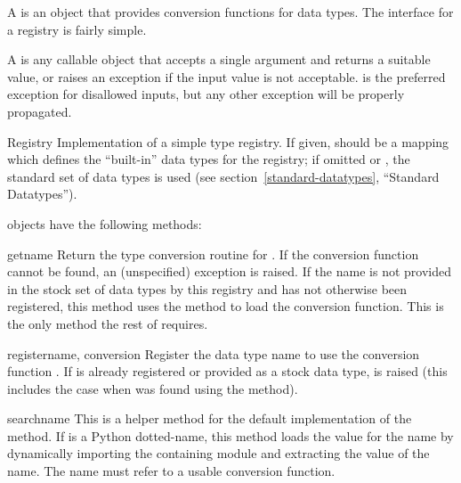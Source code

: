 \documentclass{howto}
\begin{document}
A  is an object that provides conversion
functions for data types.  The interface for a registry is fairly
simple.

A  is any callable object that accepts a
single argument and returns a suitable value, or raises an exception
if the input value is not acceptable.   is the
preferred exception for disallowed inputs, but any other exception
will be properly propagated.

\begin{classdesc}{Registry}{}
  Implementation of a simple type registry.  If given, 
  should be a mapping which defines the ``built-in'' data types for
  the registry; if omitted or , the standard set of data
  types is used (see section~\ref{standard-datatypes}, ``Standard
   Datatypes'').
\end{classdesc}

 objects have the following methods:

\begin{methoddesc}{get}{name}
  Return the type conversion routine for .  If the
  conversion function cannot be found, an (unspecified) exception is
  raised.  If the name is not provided in the stock set of data types
  by this registry and has not otherwise been registered, this method
  uses the  method to load the conversion function.
  This is the only method the rest of  requires.
\end{methoddesc}

\begin{methoddesc}{register}{name, conversion}
  Register the data type name  to use the conversion
  function .  If  is already registered or
  provided as a stock data type,  is raised
  (this includes the case when  was found using the
   method).
\end{methoddesc}

\begin{methoddesc}{search}{name}
  This is a helper method for the default implementation of the
   method.  If  is a Python dotted-name, this
  method loads the value for the name by dynamically importing the
  containing module and extracting the value of the name.  The name
  must refer to a usable conversion function.
\end{methoddesc}
\end{document}
